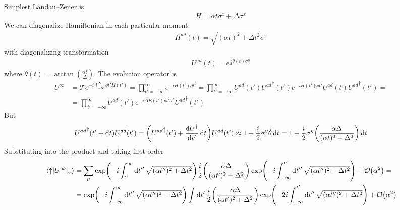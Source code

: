 Simplest Landau--Zener is
\begin{align}
H = \alpha t \sigma^z + \Delta \sigma^x
\end{align}
We can diagonalize Hamiltonian in each particular moment:
\begin{align}
H^{ad} (t) = \sqrt{(\alpha t)^2+\Delta t^2} \sigma^z
\end{align}
with diagonalizing transformation
\begin{align}
U^{ad} (t) = e^{\frac{1}{2} \theta(t) \sigma^y}
\end{align}
where $\theta(t) = \arctan(\frac{\alpha t}{\Delta})$.
The evolution operator is
\begin{align}
U^\infty &= \mathcal{T} e^{-i \int_{-\infty}^{\infty} \dd{t'} H(t')} = \prod_{t' = -\infty}^\infty  e^{-i H(t') \dd{t'}} = \prod_{t' = -\infty}^\infty  U^{ad}(t') {U^{ad}}^\dagger(t') e^{-i H(t') \dd{t'}} U^{ad}(t) { U^{ad}}^\dagger(t') =\\&= \prod_{t' =-\infty}^\infty  U^{ad}(t') e^{-i \Delta E(t') \dd{t'} \sigma^z} { U^{ad}}^\dagger(t')
\end{align}
But 
\begin{align}
{ U^{ad}}^\dagger(t'+\dd{t})U^{ad}(t') = \qty({ U^{ad}}^\dagger(t') + \dv{U^\dagger}{t'}  \dd{t}) U^{ad}(t') \approx 1 + \frac{i}{2} \sigma^y \dot{\theta} \dd{t}= 1 + \frac{i}{2} \sigma^y  \qty(\frac{\alpha \Delta}{(\alpha t)^2+\Delta^2})\dd{t}
\end{align}
Substituting into the product and taking first order
\begin{align}
\mel{\uparrow}{U^\infty}{\downarrow} &= \sum_{t'} \exp(-i \int_{t'}^\infty \dd{t''} \sqrt{(\alpha t'')^2+\Delta t^2}) \frac{i}{2}  \qty(\frac{\alpha \Delta}{(\alpha t')^2+\Delta^2}) \exp(-i \int_{-\infty}^{t'} \dd{t''} \sqrt{(\alpha t'')^2+\Delta t^2}) + \order{\alpha^2} =\\&=
\exp(-i \int_{-\infty}^\infty \dd{t''} \sqrt{(\alpha t'')^2+\Delta t^2})  \int \dd{t'} \frac{i}{2}  \qty(\frac{\alpha \Delta}{(\alpha t')^2+\Delta^2}) \exp(-2i \int_{-\infty}^{t'} \dd{t''} \sqrt{(\alpha t'')^2+\Delta t^2}) + \order{\alpha^2}
\end{align}

